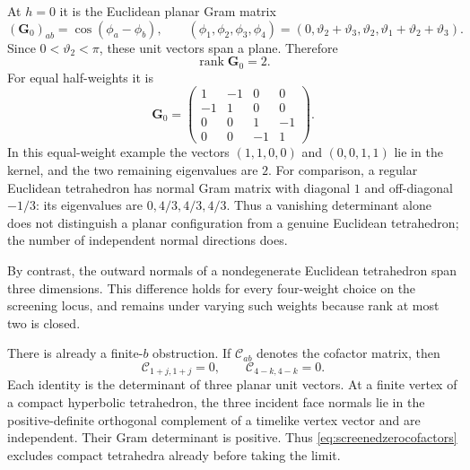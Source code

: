 At $h=0$ it is the Euclidean planar Gram matrix
\begin{equation}
 (\mathbf G_0)_{ab}=\cos(\phi_a-\phi_b),\qquad
 (\phi_1,\phi_2,\phi_3,\phi_4)=
 (0,\vartheta_2+\vartheta_3,\vartheta_2,
                       \vartheta_1+\vartheta_2+\vartheta_3).
 \label{eq:screenedplanarGram}
\end{equation}
Since $0<\vartheta_2<\pi$, these unit vectors span a plane.
Therefore
\begin{equation}
 \boxed{\qquad \operatorname{rank}\mathbf G_0=2.\qquad}
 \label{eq:screenedranktwo}
\end{equation}
For equal half-weights it is
\[
 \mathbf G_0=
 \begin{pmatrix}1&-1&0&0\\-1&1&0&0\\
                 0&0&1&-1\\0&0&-1&1\end{pmatrix}.
\]
In this equal-weight example the vectors $(1,1,0,0)$ and
$(0,0,1,1)$ lie in the kernel, and the two remaining eigenvalues
are $2$. For comparison, a regular Euclidean tetrahedron has
normal Gram matrix with diagonal $1$ and off-diagonal $-1/3$:
its eigenvalues are $0,4/3,4/3,4/3$. Thus a vanishing determinant
alone does not distinguish a planar configuration from a genuine
Euclidean tetrahedron; the number of independent normal directions does.

By contrast, the outward normals of a nondegenerate Euclidean
tetrahedron span three dimensions. This difference holds for
every four-weight choice on the screening locus, and remains
under varying such weights because rank at most two is closed.

There is already a finite-$b$ obstruction. If $\mathcal C_{ab}$
denotes the cofactor matrix, then
\begin{equation}
 \mathcal C_{1+j,1+j}=0,\qquad
 \mathcal C_{4-k,4-k}=0.
 \label{eq:screenedzerocofactors}
\end{equation}
Each identity is the determinant of three planar unit vectors.
At a finite vertex of a compact hyperbolic tetrahedron, the
three incident face normals lie in the positive-definite
orthogonal complement of a timelike vertex vector and are
independent. Their Gram determinant is positive. Thus
\eqref{eq:screenedzerocofactors} excludes compact tetrahedra
already before taking the limit.

